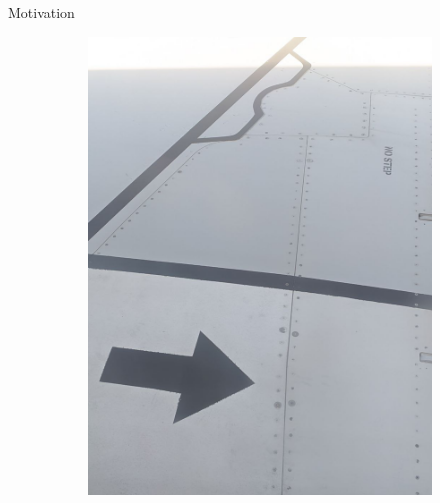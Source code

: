 \documentclass[aspectratio=43, xcolor=table]{beamer}
\begin{document}
\begin{frame}{Motivation}
\begin{figure}
\begin{subfigure}{0.45\textwidth}
			\includegraphics[width=\textwidth]{Images/wing_closer.jpg}
		\end{subfigure}

	\end{figure}
\end{frame}
\end{document}
